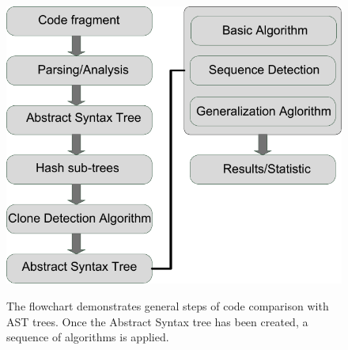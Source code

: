 \documentclass{report}
\begin{document}
\begin{figure}[hb]
  \centering
  \includegraphics[scale=0.75]{Figures/exist-alg/ast-scheme2.pdf}\\[0.1cm]
  \caption[General steps of code comparison with AST tree]{The flowchart demonstrates general steps of code comparison with AST trees. Once the Abstract Syntax tree has been created, a sequence of algorithms is applied.}
\end{figure}
\end{document}

